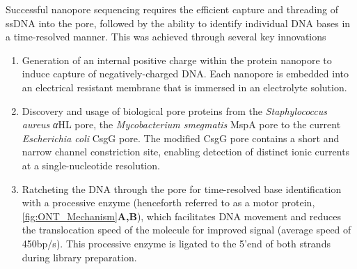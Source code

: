 Successful nanopore sequencing requires the efficient capture and threading of ssDNA into the pore, followed by the ability to identify individual DNA bases in a time-resolved manner. This was achieved through several key innovations\cite{Bayley2015} 
\begin{enumerate}
	\item Generation of an internal positive charge within the protein nanopore to induce capture of negatively-charged DNA. Each nanopore is embedded into an electrical resistant membrane that is immersed in an electrolyte solution.
	\item Discovery and usage of biological pore proteins from the \textit{Staphylococcus aureus} \textit{α}HL\cite{N2005} pore, the \textit{Mycobacterium smegmatis} MspA pore\cite{Manrao2011} to the current \textit{Escherichia coli} CsgG pore. The modified CsgG pore contains a short and narrow channel constriction site, enabling detection of distinct ionic currents at a single-nucleotide resolution. 
	\item Ratcheting the DNA through the pore for time-resolved base identification with a processive enzyme (henceforth referred to as a motor protein, \cref{fig:ONT_Mechanism}\textbf{A,B}), which facilitates DNA movement and reduces the translocation speed of the molecule for improved signal (average speed of 450bp/s)\cite{Rang2018}. This processive enzyme is ligated to the 5'end of both strands during library preparation.   
\end{enumerate}

